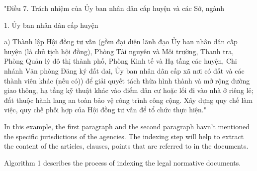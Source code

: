     "Điều 7. Trách nhiệm của Ủy ban nhân dân cấp huyện và các Sở, ngành
    
    1. Ủy ban nhân dân cấp huyện
    
    a) Thành lập Hội đồng tư vấn (gồm đại diện lãnh đạo Ủy ban nhân dân cấp huyện (là chủ tịch hội đồng), Phòng Tài nguyên và Môi trường, Thanh tra, Phòng Quản lý đô thị thành phố, Phòng Kinh tế và Hạ tầng các huyện, Chi nhánh Văn phòng Đăng ký đất đai, Ủy ban nhân dân cấp xã nơi có đất và các thành viên khác (nếu có)) để giải quyết tách thừa hình thành và mở rộng đường giao thông, hạ tầng kỹ thuật khác vào điểm dân cư hoặc lối đi vào nhà ở riêng lẻ; đất thuộc hành lang an toàn bảo vệ công trình công cộng.
    Xây dựng quy chế làm việc, quy chế phối hợp của Hội đồng tư vấn để tổ chức thực hiện."

    In this example, the first paragraph and the second paragraph havn't mentioned the specific jurisdictions of the agencies. The indexing step will help to extract the content of the articles, clauses, points that are referred to in the documents.

    Algorithm 1 describes the process of indexing the legal normative documents.

